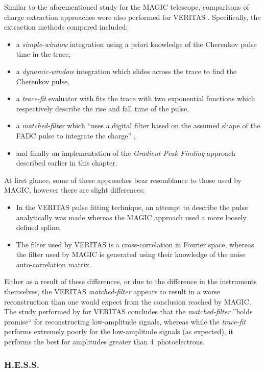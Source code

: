 Similar to the aforementioned study for the MAGIC telescope, comparisons of charge extraction approaches were also performed for VERITAS \cite{Holder2005, Cogan2006, Cogan2007}. Specifically, the extraction methods compared included:
\begin{itemize}
\item a \textit{simple-window} integration using a priori knowledge of the Cherenkov pulse time in the trace,
\item a \textit{dynamic-window} integration which slides across the trace to find the Cherenkov pulse,
\item a \textit{trace-fit} evaluator with fits the trace with two exponential functions which respectively describe the rise and fall time of the pulse,
\item a \textit{matched-filter} which ``uses a digital filter based on the assumed shape of the FADC pulse to integrate the charge'' \cite[][p.\@ 2]{Cogan2007},
\item and finally an implementation of the \textit{Gradient Peak Finding} approach described earlier in this chapter.
\end{itemize}
At first glance, some of these approaches bear resemblance to those used by MAGIC, however there are slight differences: 
\begin{itemize}
	\item In the VERITAS pulse fitting technique, an attempt to describe the pulse analytically was made whereas the MAGIC approach used a more loosely defined spline.
	\item The filter used by VERITAS is a cross-correlation in Fourier space, whereas the filter used by MAGIC is generated using their knowledge of the noise auto-correlation matrix.
\end{itemize}
Either as a result of these differences, or due to the difference in the instruments themselves, the VERITAS \textit{matched-filter} appears to result in a worse reconstruction than one would expect from the conclusion reached by MAGIC. The study performed by \textcite{Cogan2007} for VERITAS concludes that the \textit{matched-filter} ''holds promise`` for reconstructing low-amplitude signals, whereas while the \textit{trace-fit} performs extremely poorly for the low-amplitude signals (as expected), it performs the best for amplitudes greater than 4~photoelectrons.

\subsubsection{H.E.S.S.}

